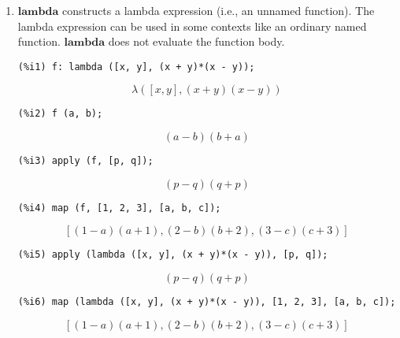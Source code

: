 \documentclass[12pt,leqno]{article}
\begin{document}
\begin{enumerate}
\item $\mathbf{lambda}$ constructs a lambda expression (i.e., an unnamed function).
The lambda expression can be used in some contexts like an ordinary named function.
$\mathbf{lambda}$ does not evaluate the function body.
\begin{verbatim}
(%i1) f: lambda ([x, y], (x + y)*(x - y));
\end{verbatim}
\begin{dmath}[number={\(\mathop{\mathrm{\%o}_{1}}\)}]
\lambda\left(\left[x, y\right], \left(x+y\right) \left(x-y\right)\right)
\end{dmath}
\begin{verbatim}
(%i2) f (a, b);
\end{verbatim}
\begin{dmath}[number={\(\mathop{\mathrm{\%o}_{2}}\)}]
\left(a-b\right) \left(b+a\right)
\end{dmath}
\begin{verbatim}
(%i3) apply (f, [p, q]);
\end{verbatim}
\begin{dmath}[number={\(\mathop{\mathrm{\%o}_{3}}\)}]
\left(p-q\right) \left(q+p\right)
\end{dmath}
\begin{verbatim}
(%i4) map (f, [1, 2, 3], [a, b, c]);
\end{verbatim}
\begin{dmath}[number={\(\mathop{\mathrm{\%o}_{4}}\)}]
\left[\left(1-a\right) \left(a+1\right), \left(2-b\right) \left(b+2\right), \left(3-c\right) \left(c+3\right)\right]
\end{dmath}
\begin{verbatim}
(%i5) apply (lambda ([x, y], (x + y)*(x - y)), [p, q]);
\end{verbatim}
\begin{dmath}[number={\(\mathop{\mathrm{\%o}_{5}}\)}]
\left(p-q\right) \left(q+p\right)
\end{dmath}
\begin{verbatim}
(%i6) map (lambda ([x, y], (x + y)*(x - y)), [1, 2, 3], [a, b, c]);
\end{verbatim}
\begin{dmath}[number={\(\mathop{\mathrm{\%o}_{6}}\)}]
\left[\left(1-a\right) \left(a+1\right), \left(2-b\right) \left(b+2\right), \left(3-c\right) \left(c+3\right)\right]
\end{dmath}


\end{enumerate}
\end{document}
